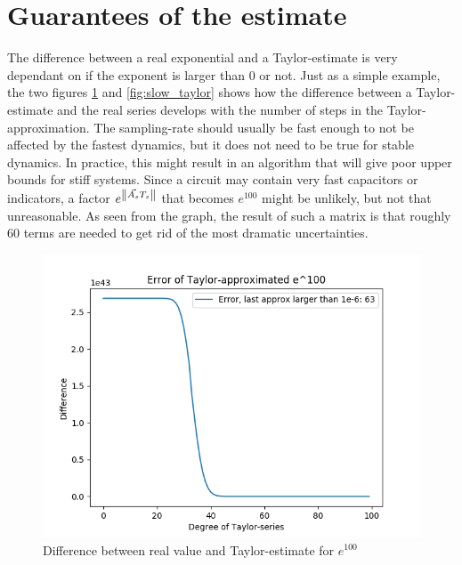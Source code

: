 \section{Guarantees of the estimate}
\label{sec:guarantees_of_estimate}
The difference between a real exponential and a Taylor-estimate is very dependant on if the exponent is larger than 0 or not. Just as a simple example, the two figures \cref{fig:fast_taylor} and \cref{fig:slow_taylor} shows how the difference between a Taylor-estimate and the real series develops with the number of steps in the Taylor-approximation. The sampling-rate should usually be fast enough to not be affected by the fastest dynamics, but it does not need to be true for stable dynamics. In practice, this might result in an algorithm that will give poor upper bounds for stiff systems. Since a circuit may contain very fast capacitors or indicators, a factor $e^{\left\lVert\Vec{A_s} T_s\right\rVert}$ that becomes $e^100$ might be unlikely, but not that unreasonable. As seen from the graph, the result of such a matrix is that roughly 60 terms are needed to get rid of the most dramatic uncertainties. 
\begin{figure}
 \centering
 \includegraphics[width=\textwidth,height=\textheight,keepaspectratio]{Figures/taylor_estimate.png}
 \caption{Difference between real value and Taylor-estimate for $e^100$}
 \label{fig:fast_taylor}
\end{figure}{}

